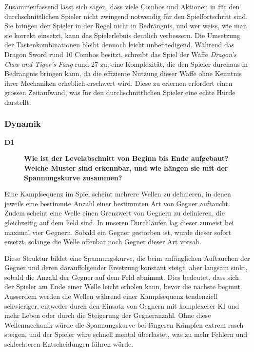 \documentclass[../Main.tex]{subfiles}
\begin{document}
Zusammenfassend lässt sich sagen, dass viele Combos und Aktionen in  für den durchschnittlichen Spieler nicht zwingend notwendig für den Spielfortschritt sind. Sie bringen den Spieler in der Regel nicht in Bedrängnis, und wer weiss, wie man sie korrekt einsetzt, kann das Spielerlebnis deutlich verbessern. Die Umsetzung der Tastenkombinationen bleibt dennoch leicht unbefriedigend. Während das Dragon Sword rund 10 Combos besitzt, schreibt das Spiel der Waffe \textit{Dragon's Claw and Tiger's Fang} rund 27 zu,\autocite{koeitechmo_ninjagaiden_2012} eine Komplexität, die den Spieler durchaus in Bedrängnis bringen kann, da die effiziente Nutzung dieser Waffe ohne Kenntnis ihrer Mechaniken erheblich erschwert wird. Diese zu erlernen erfordert einen grossen Zeitaufwand, was für den durchschnittlichen Spieler eine echte Hürde darstellt.

\subsubsection{Dynamik}

\begin{description}
    \item[\textbf{D1}] \textbf{Wie ist der Levelabschnitt von Beginn bis Ende aufgebaut? Welche Muster sind erkennbar, und wie hängen sie mit der Spannungskurve zusammen?}
\end{description}

Eine Kampfsequenz im Spiel scheint mehrere Wellen zu definieren, in denen jeweils eine bestimmte Anzahl einer bestimmten Art von Gegner auftaucht. Zudem scheint eine Welle einen Grenzwert von Gegnern zu definieren, die gleichzeitig auf dem Feld sind. In unseren Durchläufen lag dieser zumeist bei maximal vier Gegnern. Sobald ein Gegner gestorben ist, wurde dieser sofort ersetzt, solange die Welle offenbar noch Gegner dieser Art vorsah.

Diese Struktur bildet eine Spannungskurve, die beim anfänglichen Auftauchen der Gegner und deren darauffolgender Ersetzung konstant steigt, aber langsam sinkt, sobald die Anzahl der Gegner auf dem Feld abnimmt. Dies bedeutet, dass sich der Spieler am Ende einer Welle leicht erholen kann, bevor die nächste beginnt. Ausserdem werden die Wellen während einer Kampfsequenz tendenziell schwieriger, entweder durch den Einsatz von Gegnern mit komplexerer KI und mehr Leben oder durch die Steigerung der Gegneranzahl. Ohne diese Wellenmechanik würde die Spannungskurve bei längeren Kämpfen extrem rasch steigen, und der Spieler wäre schnell mental überlastet, was zu mehr Fehlern und schlechteren Entscheidungen führen würde.
\end{document}
